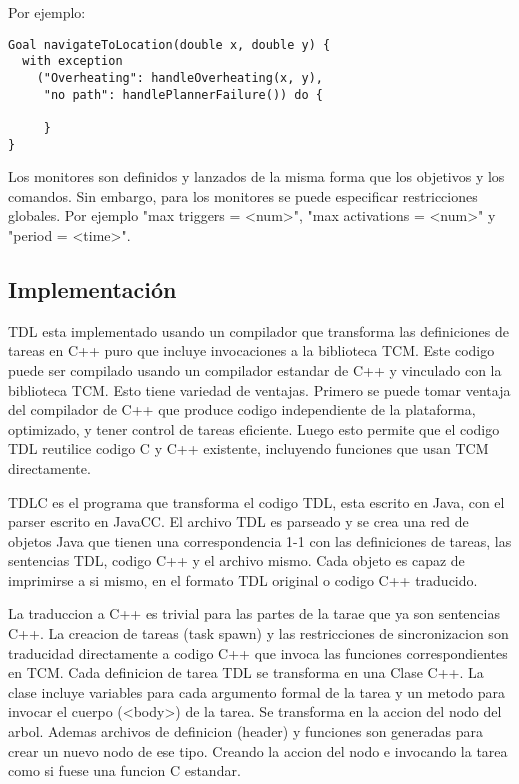 Por ejemplo:

\begin{verbatim}
Goal navigateToLocation(double x, double y) {
  with exception
    ("Overheating": handleOverheating(x, y),
     "no path": handlePlannerFailure()) do {

     }
}
\end{verbatim}

Los monitores son definidos y lanzados de la misma forma que los objetivos
y los comandos.
Sin embargo, para los monitores se puede especificar restricciones globales.
Por ejemplo "max triggers = <num>", "max activations = <num>"
y "period = <time>".

\subsection{Implementación}

TDL esta implementado usando un compilador que transforma las definiciones
de tareas en C++ puro que incluye invocaciones a la biblioteca TCM.
Este codigo puede ser compilado usando un compilador estandar de C++ y
vinculado con la biblioteca TCM.
Esto tiene variedad de ventajas. Primero se puede tomar ventaja del
compilador de C++ que produce codigo independiente de la plataforma,
optimizado, y tener control de tareas eficiente.
Luego esto permite que el codigo TDL reutilice codigo C y C++ existente,
incluyendo funciones que usan TCM directamente.

TDLC es el programa que transforma el codigo TDL, esta escrito en Java, con
el parser escrito en JavaCC.
El archivo TDL es parseado y se crea una red de objetos Java que tienen
una correspondencia 1-1 con las definiciones de tareas, las sentencias
TDL, codigo C++ y el archivo mismo.
Cada objeto es capaz de imprimirse a si mismo, en el formato TDL original
o codigo C++ traducido.

La traduccion a C++ es trivial para las partes de la tarae que ya son
sentencias C++.
La creacion de tareas (task spawn) y las restricciones de sincronizacion
son traducidad directamente a codigo C++ que invoca las funciones 
correspondientes en TCM.
Cada definicion de tarea TDL se transforma en una Clase C++.
La clase incluye variables para cada argumento formal de la tarea y
un metodo para invocar el cuerpo (<body>) de la tarea. Se transforma
en la accion del nodo del arbol.
Ademas archivos de definicion (header) y funciones son generadas para
crear un nuevo nodo de ese tipo. Creando la accion del nodo e invocando
la tarea como si fuese una funcion C estandar.

